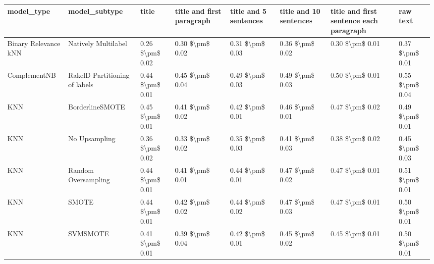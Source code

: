 \begin{tabular}{llllllll}
\toprule
                     model\_type &                 model\_subtype &           title & title and first paragraph & title and 5 sentences & title and 10 sentences & title and first sentence each paragraph &            raw text \\
\midrule
           Binary Relevance kNN &           Natively Multilabel & 0.26 \$\textbackslash pm\$ 0.02 &           0.30 \$\textbackslash pm\$ 0.02 &       0.31 \$\textbackslash pm\$ 0.03 &        0.36 \$\textbackslash pm\$ 0.02 &                         0.30 \$\textbackslash pm\$ 0.01 &     0.37 \$\textbackslash pm\$ 0.01 \\
                   ComplementNB & RakelD Partitioning of labels & 0.44 \$\textbackslash pm\$ 0.01 &           0.45 \$\textbackslash pm\$ 0.04 &       0.49 \$\textbackslash pm\$ 0.03 &        0.49 \$\textbackslash pm\$ 0.03 &                         0.50 \$\textbackslash pm\$ 0.01 &     0.55 \$\textbackslash pm\$ 0.04 \\
                            KNN &               BorderlineSMOTE & 0.45 \$\textbackslash pm\$ 0.01 &           0.41 \$\textbackslash pm\$ 0.02 &       0.42 \$\textbackslash pm\$ 0.01 &        0.46 \$\textbackslash pm\$ 0.01 &                         0.47 \$\textbackslash pm\$ 0.02 &     0.49 \$\textbackslash pm\$ 0.01 \\
                            KNN &                 No Upsampling & 0.36 \$\textbackslash pm\$ 0.02 &           0.33 \$\textbackslash pm\$ 0.02 &       0.35 \$\textbackslash pm\$ 0.03 &        0.41 \$\textbackslash pm\$ 0.03 &                         0.38 \$\textbackslash pm\$ 0.02 &     0.45 \$\textbackslash pm\$ 0.03 \\
                            KNN &           Random Oversampling & 0.44 \$\textbackslash pm\$ 0.01 &           0.41 \$\textbackslash pm\$ 0.01 &       0.44 \$\textbackslash pm\$ 0.01 &        0.47 \$\textbackslash pm\$ 0.02 &                         0.47 \$\textbackslash pm\$ 0.01 &     0.51 \$\textbackslash pm\$ 0.01 \\
                            KNN &                         SMOTE & 0.44 \$\textbackslash pm\$ 0.01 &           0.42 \$\textbackslash pm\$ 0.02 &       0.44 \$\textbackslash pm\$ 0.02 &        0.47 \$\textbackslash pm\$ 0.03 &                         0.47 \$\textbackslash pm\$ 0.01 &     0.50 \$\textbackslash pm\$ 0.01 \\
                            KNN &                      SVMSMOTE & 0.41 \$\textbackslash pm\$ 0.01 &           0.39 \$\textbackslash pm\$ 0.04 &       0.42 \$\textbackslash pm\$ 0.01 &        0.45 \$\textbackslash pm\$ 0.02 &                         0.45 \$\textbackslash pm\$ 0.01 &     0.50 \$\textbackslash pm\$ 0.01 \\

\end{tabular}
